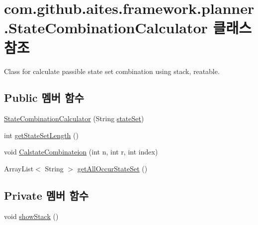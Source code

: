 \hypertarget{classcom_1_1github_1_1aites_1_1framework_1_1planner_1_1_state_combination_calculator}{}\section{com.\+github.\+aites.\+framework.\+planner.\+State\+Combination\+Calculator 클래스 참조}
\label{classcom_1_1github_1_1aites_1_1framework_1_1planner_1_1_state_combination_calculator}


Class for calculate passible state set combination using stack, reatable.  


\subsection*{Public 멤버 함수}
\begin{DoxyCompactItemize}
\item 
\mbox{\hyperlink{classcom_1_1github_1_1aites_1_1framework_1_1planner_1_1_state_combination_calculator_a5c7bde442e7bc135147c46d66a448d1a}{State\+Combination\+Calculator}} (String \mbox{\hyperlink{classcom_1_1github_1_1aites_1_1framework_1_1planner_1_1_state_combination_calculator_af0002d5e5c2d3034f606f4586d7796a8}{state\+Set}})
\item 
int \mbox{\hyperlink{classcom_1_1github_1_1aites_1_1framework_1_1planner_1_1_state_combination_calculator_ad5a1d8670eb248155fb48cec411b74e3}{get\+State\+Set\+Length}} ()
\item 
void \mbox{\hyperlink{classcom_1_1github_1_1aites_1_1framework_1_1planner_1_1_state_combination_calculator_aace63fc6e53cff5e89bbc163a2eb94ef}{Calstate\+Combinateion}} (int n, int r, int index)
\item 
Array\+List$<$ String $>$ \mbox{\hyperlink{classcom_1_1github_1_1aites_1_1framework_1_1planner_1_1_state_combination_calculator_a223c72d9d6b3712191a3463f2c30dfdc}{get\+All\+Occur\+State\+Set}} ()
\end{DoxyCompactItemize}
\subsection*{Private 멤버 함수}
\begin{DoxyCompactItemize}
\item 
void \mbox{\hyperlink{classcom_1_1github_1_1aites_1_1framework_1_1planner_1_1_state_combination_calculator_a50816c67726a7d23e579994f5fa66315}{show\+Stack}} ()
\end{DoxyCompactItemize}
